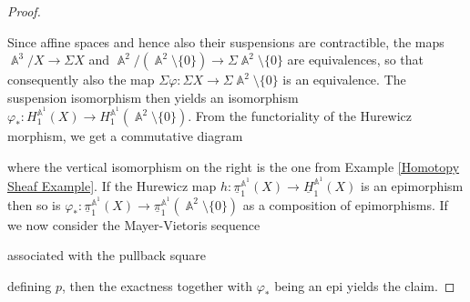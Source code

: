 \documentclass[english]{amsart}
\theoremstyle{definition}
\newcommand\reallywidetilde[1]{\ThisStyle{%
  \setbox0=\hbox{$\SavedStyle#1$}%
  \stackengine{-.1\LMpt}{$\SavedStyle#1$}{%
    \stretchto{\scaleto{\SavedStyle\mkern.2mu\AC}{.5150\wd0}}{.4\ht0}%
  }{O}{c}{F}{T}{S}%
}}
\DeclareMathOperator{\A}{\mathbb{A}}
\begin{document}
\begin{proof}
\begin{center}
\end{center}
Since affine spaces and hence also their suspensions are contractible, the maps $\A^3 / X \to \Sigma X$ and $\A^2 / (\A^2 \setminus \lbrace 0 \rbrace) \to \Sigma \! \A^2 \setminus \lbrace 0 \rbrace$ are equivalences, so that consequently also the map $\Sigma \varphi \colon \Sigma X \to \Sigma \! \A^2 \setminus \lbrace 0 \rbrace$ is an equivalence. The suspension isomorphism then yields an isomorphism $\varphi_*\colon H_1^{\A^1}\!(X)\to H_1^{\A^1}\!(\A^2\setminus\lbrace 0\rbrace)$. From the functoriality of the Hurewicz morphism, we get a commutative diagram
\begin{center}
\end{center}
where the vertical isomorphism on the right is the one from Example \ref{Homotopy Sheaf Example}. If the Hurewicz map $h \colon \underline{\pi}_1^{\A^1}\!(X)\to \underline{H}_1^{\A^1}\!(X)$ is an epimorphism then so is  $\varphi_*\colon\underline{\pi}_1^{\A^1}\!(X) \to \underline{\pi}_1^{\A^1}\!(\A^2\setminus\lbrace 0\rbrace)$ as a composition of epimorphisms. If we now consider the Mayer-Vietoris sequence 
\begin{center}
\end{center}
associated with the pullback square
\begin{center}
\end{center}
defining $p$, then the exactness together with $\varphi_*$ being an epi yields the claim.
\end{proof}
\end{document}

